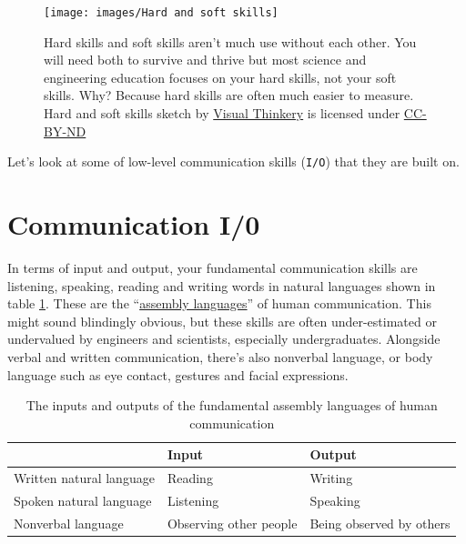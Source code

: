 \documentclass[
]{book}
\begin{document}
\begin{figure}

{\centering \texttt{[image: images/Hard and soft skills]} 

}

\caption{Hard skills and soft skills aren't much use without each other. You will need both to survive and thrive but most science and engineering education focuses on your hard skills, not your soft skills. Why? Because hard skills are often much easier to measure. Hard and soft skills sketch by \href{https://visualthinkery.com/}{Visual Thinkery} is licensed under \href{https://creativecommons.org/licenses/by-nd/4.0/}{CC-BY-ND}}\label{fig:allskills-fig}
\end{figure}



Let's look at some of low-level communication skills (\texttt{I/O}) that they are built on.

\hypertarget{cio}{%
\section{Communication I/0}\label{cio}}

In terms of input and output, your fundamental communication skills are listening, speaking, reading and writing words in natural languages shown in table \ref{tab:iotable}. These are the ``\href{https://en.wikipedia.org/wiki/Assembly_language}{assembly languages}'' of human communication. This might sound blindingly obvious, but these skills are often under-estimated or undervalued by engineers and scientists, especially undergraduates. Alongside verbal and written communication, there's also nonverbal language, or body language such as eye contact, gestures and facial expressions.

\begin{table}

\caption{\label{tab:iotable}The inputs and outputs of the fundamental assembly languages of human communication }
\centering
\begin{tabular}[t]{lll}
\toprule
 & Input & Output\\
\midrule
Written natural language & Reading & Writing\\
Spoken natural language & Listening & Speaking\\
Nonverbal language & Observing other people & Being observed by others\\
\bottomrule
\end{tabular}
\end{table}
\end{document}
